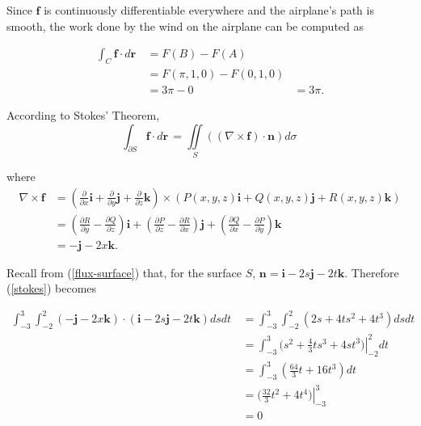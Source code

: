 \item
Since $\mathbf{f}$ is continuously differentiable everywhere and the airplane's
path is smooth, the work done by the wind on the airplane can be computed
as

\begin{align*}
 \int_C \! \mathbf{f} \cdot d\mathbf{r} \,
 &= F(B) - F(A) \\
 &= F(\pi, 1, 0) - F(0, 1, 0) \\
 &= 3\pi - 0
 &= 3\pi.
\end{align*}

\EEN

\item

According to Stokes' Theorem,
\begin{equation}
 \int_{\partial S} \! \mathbf{f} \cdot d\mathbf{r} \,
 = \iint\limits_S \! ((\nabla \times \mathbf{f}) \cdot \mathbf{n}) d\sigma \, \label{stokes}
\end{equation}

where
\begin{align*}
 \nabla \times \mathbf{f}
 &= (\frac{\partial}{\partial x}\mathbf{i} + \frac{\partial}{\partial y}\mathbf{j} + \frac{\partial}{\partial z}\mathbf{k}) \times (P(x,y,z)\mathbf{i} + Q(x,y,z)\mathbf{j} + R(x,y,z)\mathbf{k}) \\
 &= (\frac{\partial R}{\partial y} - \frac{\partial Q}{\partial z})\mathbf{i} + (\frac{\partial P}{\partial z} - \frac{\partial R}{\partial x})\mathbf{j} + (\frac{\partial Q}{\partial x} - \frac{\partial P}{\partial y})\mathbf{k} \\
 &= -\mathbf{j} - 2x\mathbf{k}.
\end{align*}

Recall from (\ref{flux-surface}) that, for the surface $S$, $\mathbf{n} =
\mathbf{i} -2s\mathbf{j} -2t\mathbf{k}$.  Therefore (\ref{stokes}) becomes

\begin{align*}
 \int_{-3}^{3} \int_{-2}^{2} \! (-\mathbf{j} - 2x\mathbf{k}) \cdot (\mathbf{i} -2s\mathbf{j} -2t\mathbf{k}) dsdt \,
 &= \int_{-3}^{3} \int_{-2}^{2} \! (2s + 4ts^2 + 4t^3) dsdt \, \\
 &= \int_{-3}^{3} \! (\left. s^2 + \frac{4}{3}ts^3 + 4st^3) \right|_{-2}^{2} dt \, \\
 &= \int_{-3}^{3} \! (\frac{64}{3}t + 16t^3) dt \, \\
 &= (\left. \frac{32}{3}t^2 + 4t^4) \right|_{-3}^{3} \\
 &= 0
\end{align*}


\EEN
